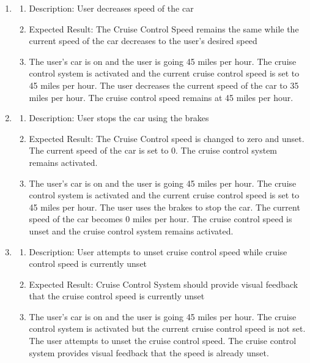 \documentclass[preprint,11pt,3p]{article}
\begin{document}
\begin{enumerate}
	\item
		\begin{enumerate}
	\item Description: User decreases speed of the car
	\item Expected Result: The Cruise Control Speed remains the same while the current speed of the car decreases to the user’s desired speed
	\item The user’s car is on and the user is going 45 miles per hour. The cruise control system is activated and the current cruise control speed is set to 45 miles per hour. The user decreases the current speed of the car to 35 miles per hour. The cruise control speed remains at 45 miles per hour.
\end{enumerate}

	\item 
		\begin{enumerate}
	\item Description: User stops the car using the brakes
	\item Expected Result: The Cruise Control speed is changed to zero and unset. The current speed of the car is set to 0. The cruise control system remains activated.
	\item The user’s car is on and the user is going 45 miles per hour. The cruise control system is activated and the current cruise control speed is set to 45 miles per hour. The user uses the brakes to stop the car. The current speed of the car becomes 0 miles per hour. The cruise control speed is unset and the cruise control system remains activated. 
\end{enumerate}

	\item
		\begin{enumerate}
	\item Description: User attempts to unset cruise control speed while cruise control speed is currently unset
	\item Expected Result: Cruise Control System should provide visual feedback that the cruise control speed is currently unset
	\item The user’s car is on and the user is going 45 miles per hour. The cruise control system is activated but the current cruise control speed is not set. The user attempts to unset the cruise control speed. The cruise control system provides visual feedback that the speed is already unset.
\end{enumerate}


\end{enumerate}
\end{document}
